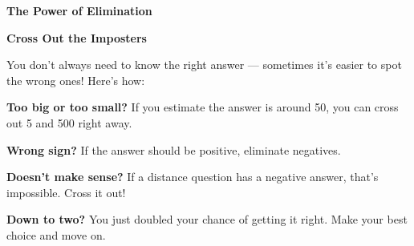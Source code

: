 \clearpage
\thispagestyle{empty}
{\sffamily

\begin{center}
{\fontsize{22}{26}\selectfont\bfseries\color{funPurple} \faTimesCircle\hspace{3mm}The Power of Elimination\hspace{3mm}\faTimesCircle}

\vspace{2mm}
{\color{funGray}\hrulefill}
\end{center}

\vspace{3mm}

\begin{tcolorbox}[
    enhanced,
    colback=funPurpleLight,
    colframe=funPurple!50,
    arc=10pt,
    boxrule=1.5pt,
    left=6mm, right=6mm, top=5mm, bottom=5mm,
]
{\large\bfseries\color{funPurpleDark} \faCut\hspace{2mm}Cross Out the Imposters}

\vspace{2mm}

You don't always need to know the right answer — sometimes it's easier to spot the wrong ones! Here's how:

\vspace{3mm}

\textcolor{funPurple}{\faArrowRight}\hspace{2mm}\textbf{Too big or too small?} If you estimate the answer is around 50, you can cross out 5 and 500 right away.

\vspace{2mm}

\textcolor{funPurple}{\faArrowRight}\hspace{2mm}\textbf{Wrong sign?} If the answer should be positive, eliminate negatives.

\vspace{2mm}

\textcolor{funPurple}{\faArrowRight}\hspace{2mm}\textbf{Doesn't make sense?} If a distance question has a negative answer, that's impossible. Cross it out!

\vspace{2mm}

\textcolor{funPurple}{\faArrowRight}\hspace{2mm}\textbf{Down to two?} You just doubled your chance of getting it right. Make your best choice and move on.
\end{tcolorbox}

}
